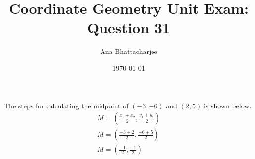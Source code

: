 \documentclass{article}
\begin{document}
\title{Coordinate Geometry Unit Exam: Question 31}
\author{Ana Bhattacharjee}
\date{\today}
\maketitle{}

\begin{center}
The steps for calculating the midpoint of $(-3, -6)$ and $(2, 5)$ is shown below.
\begin{align}
M = (\frac{x_1 + x_2}{2}, \frac{y_1 + y_2}{2}) \\
M = (\frac{-3 + 2}{2}, \frac{-6 + 5}{2}) \\
M = (\frac{-1}{2}, \frac{-1}{2}) 
\end{align}
\end{center}
\end{document}
